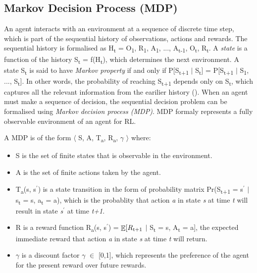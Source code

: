 \documentclass[12pt,twoside]{report}
\theoremstyle{plain}
\theoremstyle{definition}
\DeclareMathOperator{\E}{\mathbb{E}}
\begin{document}
\subsection{Markov Decision Process (MDP)}
\label{mdp_subsection}
An agent interacts with an environment at a sequence of discrete time step, which is part of the sequential history of observations, actions and rewards. The sequential history is formalised as H\textsubscript{t} = O\textsubscript{1}, R\textsubscript{1}, A\textsubscript{1}, ..., A\textsubscript{t-1}, O\textsubscript{t}, R\textsubscript{t}.  A \textit{state} is a function of the history S\textsubscript{t} = f(H\textsubscript{t}), which determines the next environment.  A state S\textsubscript{t} is said to have \textit{Markov property} if and only if P[S\textsubscript{t+1} $\vert$ S\textsubscript{t}] = P[S\textsubscript{t+1} $\vert$ S\textsubscript{1}, ..., S\textsubscript{t}]. In other words, the probability of reaching S\textsubscript{t+1} depends only on S\textsubscript{t}, which captures all the relevant information from the earilier history (\cite{Puterman1994}).
When an agent must make a sequence of decision, the sequential decision problem can be formalised using \textit{Markov decision process (MDP)}. MDP formaly represents a fully observable environment of an agent for RL.

A MDP is of the form $\langle$ S, A, T\textsubscript{a}, R\textsubscript{a}, $\gamma$ $\rangle$ where:

\begin{itemize}
\item S is the set of finite states that is observable in the environment.
\item A is the set of finite actions taken by the agent.
\item T\textsubscript{a}(s, s$^\prime$) is a state transition in the form of probability matrix Pr(S\textsubscript{t+1} = s$^\prime$ $\vert$ s\textsubscript{t} = s, a\textsubscript{t} = a), which is the probablity that action \textit{a} in state \textit{s} at time \textit{t} will result in state \textit{s$^\prime$} at time \textit{t+1}.
\item R is a reward function R\textsubscript{a}(s, s$^\prime$) = $\displaystyle \E[R\textsubscript{t+1} $ $\vert$ S\textsubscript{t} = s, A\textsubscript{t} = a], the expected immediate reward that action \textit{a} in state \textit{s} at time \textit{t} will return.
\item $\gamma$ is a discount factor $\gamma$ $\in$ [0,1], which represents the preference of the agent for the present reward over future rewards.
\end{itemize}
\end{document}
